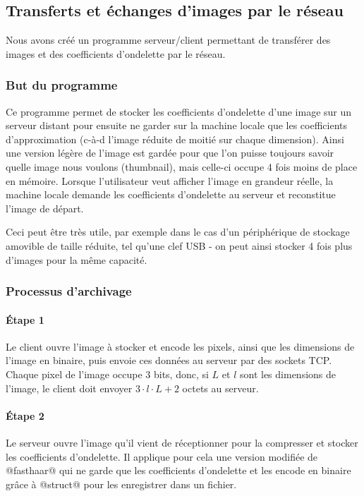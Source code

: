 \documentclass{article}
\begin{document}
\clearpage


\subsection{Transferts et échanges d'images par le réseau}
\label{net}
Nous avons créé un programme serveur/client permettant de transférer des images et des coefficients d'ondelette par le réseau.

\subsubsection{But du programme}


Ce programme permet de stocker les coefficients d'ondelette d'une image sur un serveur distant pour ensuite ne garder sur la machine locale que les coefficients d'approximation (c-à-d l'image réduite de moitié sur chaque dimension). Ainsi une version légère de l'image est gardée pour que l'on puisse toujours savoir quelle image nous voulons (thumbnail), mais celle-ci occupe 4 fois moins de place en mémoire. Lorsque l'utilisateur veut afficher l'image en grandeur réelle, la machine locale demande les coefficients d'ondelette au serveur et reconstitue l'image de départ.

Ceci peut être très utile, par exemple dans le cas d'un périphérique de stockage amovible de taille réduite, tel qu'une clef USB - on peut ainsi stocker 4 fois plus d'images pour la même capacité.


\subsubsection{Processus d'archivage}

\paragraph{Étape 1}

Le client ouvre l'image à stocker et encode les pixels, ainsi que les dimensions de l'image en binaire, puis envoie ces données au serveur par des sockets TCP. Chaque pixel de l'image occupe 3 bits, donc, si $L$ et $l$ sont les dimensions de l'image, le client doit envoyer $3\cdot{}l\cdot{}L + 2$ octets au serveur.

\paragraph{Étape 2}

Le serveur ouvre l'image qu'il vient de réceptionner pour la compresser et stocker les coefficients d'ondelette. Il applique pour cela une version modifiée de @fasthaar@ qui ne garde que les coefficients d'ondelette et les encode en binaire grâce à @struct@ pour les enregistrer dans un fichier.
\end{document}
